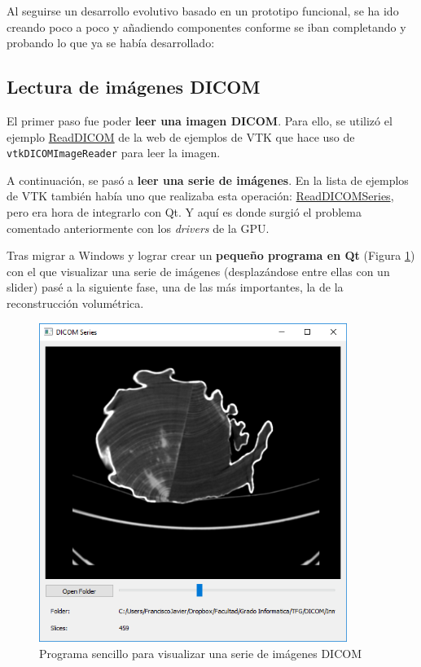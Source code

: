 Al seguirse un desarrollo evolutivo basado en un prototipo funcional, se ha ido creando poco a poco y añadiendo componentes conforme se iban completando y probando lo que ya se había desarrollado:

\subsection{Lectura de imágenes DICOM}

El primer paso fue poder \textbf{leer una imagen DICOM}. Para ello, se utilizó el ejemplo \href{http://www.vtk.org/Wiki/VTK/Examples/Cxx/IO/ReadDICOM}{ReadDICOM} de la web de ejemplos de VTK que hace uso de \texttt{vtkDICOMImageReader} para leer la imagen.

A continuación, se pasó a \textbf{leer una serie de imágenes}. En la lista de ejemplos de VTK también había uno que realizaba esta operación: \href{http://www.vtk.org/Wiki/VTK/Examples/Cxx/IO/ReadDICOMSeries}{ReadDICOMSeries}, pero era hora de integrarlo con Qt. Y aquí es donde surgió el problema comentado anteriormente con los \textit{drivers} de la GPU.

Tras migrar a Windows y lograr crear un \textbf{pequeño programa en Qt} (Figura \ref{fig:read_dicom_series_qt}) con el que visualizar una serie de imágenes (desplazándose entre ellas con un slider) pasé a la siguiente fase, una de las más importantes, la de la reconstrucción volumétrica.

\begin{figure}[H]
	\centering
	\includegraphics[width=10cm]{imagenes/read_dicom_series_qt}
	\caption{Programa sencillo para visualizar una serie de imágenes DICOM}
	\label{fig:read_dicom_series_qt}
\end{figure}

